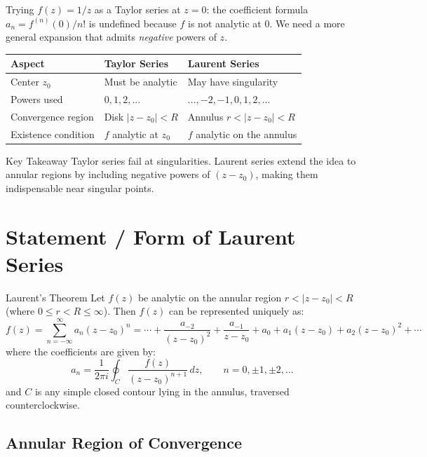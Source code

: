 \documentclass[12pt,a4paper]{article}
\begin{document}
\noindent
Trying $f(z)=1/z$ as a Taylor series at $z=0$: the coefficient formula
$a_n = f^{(n)}(0)/n!$ is undefined because $f$ is not analytic at $0$.
We need a more general expansion that admits \emph{negative} powers of $z$.

\begin{center}
\begin{tabular}{lll}
\toprule
\textbf{Aspect} & \textbf{Taylor Series} & \textbf{Laurent Series} \\
\midrule
Center $z_0$ & Must be analytic & May have singularity \\
Powers used & $0, 1, 2, \ldots$ & $\ldots, -2, -1, 0, 1, 2, \ldots$ \\
Convergence region & Disk $|z-z_0|<R$ & Annulus $r<|z-z_0|<R$ \\
Existence condition & $f$ analytic at $z_0$ & $f$ analytic on the annulus \\
\bottomrule
\end{tabular}
\end{center}

\begin{learnbox}{Key Takeaway}
Taylor series fail at singularities. Laurent series extend the idea to annular regions by
including negative powers of $(z-z_0)$, making them indispensable near singular points.
\end{learnbox}

\section{Statement / Form of Laurent Series}

\begin{infobox}{Laurent's Theorem}
Let $f(z)$ be analytic on the annular region
$r < |z - z_0| < R$ (where $0 \leq r < R \leq \infty$).
Then $f(z)$ can be represented uniquely as:
\[
  f(z) = \sum_{n=-\infty}^{\infty} a_n (z-z_0)^n
       = \cdots + \frac{a_{-2}}{(z-z_0)^2} + \frac{a_{-1}}{z-z_0}
         + a_0 + a_1(z-z_0) + a_2(z-z_0)^2 + \cdots
\]
where the coefficients are given by:
\[
  a_n = \frac{1}{2\pi i} \oint_{C} \frac{f(z)}{(z-z_0)^{n+1}}\,dz,
  \qquad n = 0, \pm 1, \pm 2, \ldots
\]
and $C$ is any simple closed contour lying in the annulus, traversed counterclockwise.
\end{infobox}

\subsection*{Annular Region of Convergence}
\end{document}
